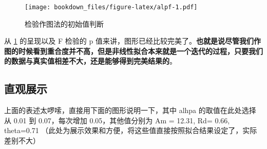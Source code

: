 \documentclass[
]{krantz}
\begin{document}
\begin{figure}
\centering
\texttt{[image: bookdown\_files/figure-latex/alpf-1.pdf]}
\caption{\label{fig:alpf}检验作图法的初始值判断}
\end{figure}

从 \ref{fig:alpf} 的呈现以及 F 检验的 p 值来讲，图形已经比较完美了。\textbf{也就是说尽管我们作图的时候看到重合度并不高，但是非线性拟合本来就是一个迭代的过程，只要我们的数据与真实值相差不大，还是能够得到完美结果的}。

\hypertarget{show_demo}{%
\subsection{直观展示}\label{show_demo}}

上面的表述太啰嗦，直接用下面的图形说明一下，其中 alhpa 的取值在此处选择从 0.01 到 0.07，每次增加 0.05，其他值分别为 Am = 12.31, Rd= 0.66, theta=0.71 （此处为展示效果和方便，将这些值直接按照拟合结果设定了，实际差别不大）
\end{document}
